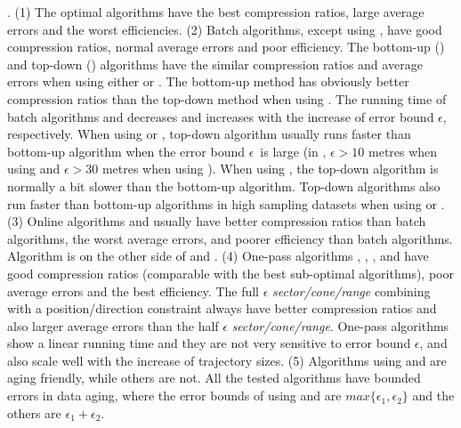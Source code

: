 {.
(1) The optimal algorithms have the best compression ratios, large average errors and the worst efficiencies.
%
(2) Batch algorithms, except \dpa using \dad, have good compression ratios, normal average errors and poor efficiency.
%
The bottom-up (\tpa) and top-down (\dpa) algorithms have the similar compression ratios and average errors when using either \ped or \sed. The bottom-up method has obviously better compression ratios than the top-down method when using \dad.
%
The running time of batch algorithms \dpa and \tpa decreases and increases with the increase of error bound $\epsilon$, respectively. When using \ped or \sed, top-down algorithm \dpa usually runs faster than bottom-up algorithm \tpa when the error bound $\epsilon$~is large  (\eg in \geolife, $\epsilon >10$ metres when using \ped and $\epsilon >30$ metres when using \sed). When using \dad, the top-down algorithm is normally a bit slower than the bottom-up algorithm.
Top-down algorithms also run faster than bottom-up algorithms in high sampling datasets when using \ped or \sed.
%
(3) Online algorithms \opwa and \bqsa usually have better compression ratios than batch algorithms, the worst average errors, and poorer efficiency than batch algorithms. Algorithm \squishe is on the other side of \opwa and \bqsa.
%
(4) One-pass algorithms \operb, \siped, \cised, \intersec and \interval have good compression ratios (comparable with the best sub-optimal algorithms), poor average errors and the best efficiency.
%
The full $\epsilon$ \emph{sector/cone/range} combining with a position/direction constraint always have better compression ratios and also larger average errors than the half $\epsilon$ \emph{sector/cone/range}. %
%
One-pass algorithms show a linear running time and they are not very sensitive to error bound $\epsilon$, and also scale well with the increase of trajectory sizes.
%
(5) {Algorithms \dpa using \ped and \sed are aging friendly, while others are not. All the tested algorithms have bounded errors in data aging, where the error bounds of \dpa using \ped and \sed are $max\{\epsilon_1, \epsilon_2\}$ and the others are $\epsilon_1 + \epsilon_2$.}

}

